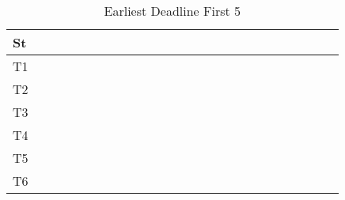 \documentclass[xcolor=table]{beamer}
\begin{document}
\begin{frame}
\begin{table}
{\begin{tabular}{|l|l|l|l|l|l|l|l|l|l|l|l|l|l|l|l|l|l|l|l|l|l|l|l|l|}
\hline 
St &  \cellcolor{green} &  \cellcolor{green} &  \cellcolor{green} &  \cellcolor{green} &  \cellcolor{green} &  \cellcolor{green} &  \cellcolor{green} &  \cellcolor{green} &  \cellcolor{green} &  \cellcolor{green} &  \cellcolor{green} &  \cellcolor{green} &  \cellcolor{green} &  \cellcolor{green} &  \cellcolor{green} &  \cellcolor{green} &  \cellcolor{green} &  \cellcolor{green} &  \cellcolor{green} &  \cellcolor{green} &  \cellcolor{green} &  \cellcolor{green} &  \cellcolor{green} &  \cellcolor{green} \\ \hline 
T1 & & & & & & & & & & & & & & & & & & & & & & & & \\ \hline 
T2 & & & & & & & & & & & & & & & & & & & & & & & & \\ \hline 
T3 & \cellcolor{cyan} & \cellcolor{cyan} & \cellcolor{cyan} & \cellcolor{cyan} & \cellcolor{cyan} & \cellcolor{cyan} & \cellcolor{cyan} & \cellcolor{cyan} & \cellcolor{cyan} & \cellcolor{cyan} & \cellcolor{cyan} & \cellcolor{cyan} & \cellcolor{cyan} & \cellcolor{cyan} & \cellcolor{cyan} & \cellcolor{cyan} & \cellcolor{cyan} & \cellcolor{cyan} & \cellcolor{cyan} & \cellcolor{cyan} & \cellcolor{cyan} & \cellcolor{cyan} & \cellcolor{cyan} & \cellcolor{cyan} \\ \hline 
T4 & & & & & & & & & & & & & & & & & & & & & & & & \\ \hline 
T5 & & & & & & & & & & & & & & & & & & & & & & & & \\ \hline 
T6 & & & & & & & & & & & & & & & & & & & & & & & & \\ \hline 
\end{tabular} 
} 
\caption{ Earliest Deadline First 5 } 
\end{table} 
\begin{table} 
\centering 
{}
\end{table}
\end{frame}
\end{document}
